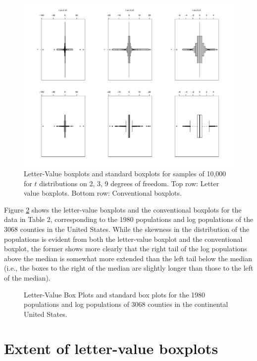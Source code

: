 \documentclass[oneside]{article}
\begin{document}
\begin{figure}[hbtp]
  \centering
  \includegraphics[scale=.5,angle=270]{tplot2kk}

  \caption{Letter-Value boxplots and standard boxplots for samples of 10,000
  for $t$ distributions on 2, 3, 9 degrees of freedom. Top row: Letter value
  boxplots. Bottom row: Conventional boxplots.}
  \label{t-dist}
\end{figure}

Figure \ref{lvpops} shows the letter-value boxplots
and the conventional boxplots for the data in Table 2,
corresponding to the 1980 populations and log populations
of the 3068 counties in the United States.  While the
skewness in the distribution of the populations is
evident from both the letter-value boxplot and the
conventional boxplot, the former shows more clearly
that the right tail of the log populations above the 
median is somewhat more extended than the left tail
below the median (i.e., the boxes to the right of
the median are slightly longer than those to the
left of the median).


\begin{figure}[hbtp]
  \centering

  \caption{Letter-Value Box Plots and standard box plots for the 1980
  populations and log populations of 3068 counties in the continental United
  States.}
  \label{lvpops} 
\end{figure}

\section{Extent of letter-value boxplots}
\end{document}
